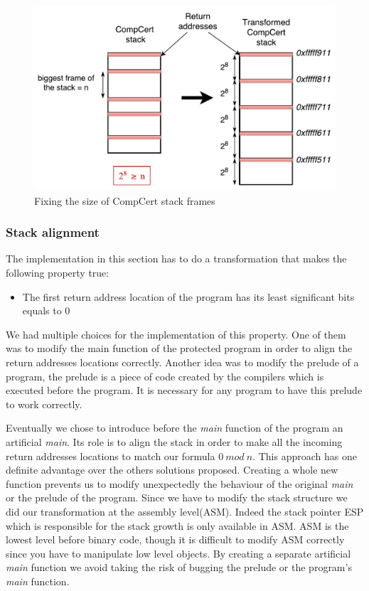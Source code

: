 \documentclass[11pt]{sdm}
\begin{document}
\begin{figure}
\centering
\includegraphics[scale=0.6]{images/stack_transform.pdf}
\caption{Fixing the size of CompCert stack frames}
\label{stack_transform}
\end{figure}

\subsubsection{Stack alignment}
\label{ssub:Stack alignment}

The implementation in this section has to do a transformation that makes the following property true:
\begin{itemize}
	\item The first return address location of the program has its least significant bits equals to 0
\end{itemize}

We had multiple choices for the implementation of this property. One of them was to modify the main function of the protected program in order to align the return addresses locations correctly. Another idea was to modify the prelude of a program, the prelude is a piece of code created by the compilers which is executed before the program. It is necessary for any program to have this prelude to work correctly.

Eventually we chose to introduce before the \textit{main} function of the program an artificial \textit{main}. Its role is to align the stack in order to make all the incoming return addresses locations to match our formula $0~mod~n$. 
This approach has one definite advantage over the others solutions proposed. Creating a whole new function prevents us to modify unexpectedly the behaviour of the original \textit{main} or the prelude of the program. \hfill \break
Since we have to modify the stack structure we did our transformation at the assembly level(ASM). Indeed the stack pointer ESP which is responsible for the stack growth is only available in ASM. ASM is the lowest level before binary code, though it is difficult to modify ASM correctly since you have to manipulate low level objects. 
By creating a separate artificial \textit{main} function we avoid taking the risk of bugging the prelude or the program's \textit{main} function.
\end{document}

